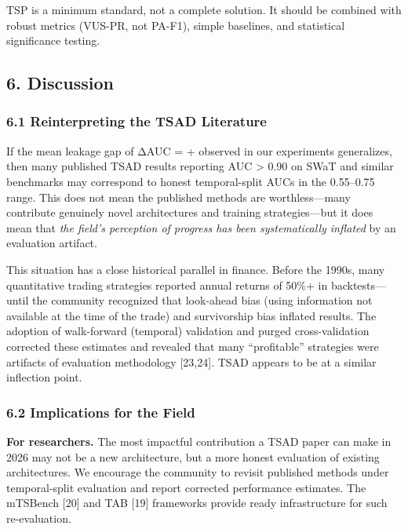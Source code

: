 \documentclass[
]{article}
\begin{document}
TSP is a minimum standard, not a complete solution. It should be
combined with robust metrics (VUS-PR, not PA-F1), simple baselines, and
statistical significance testing.

\subsection{6. Discussion}\label{discussion}

\subsubsection{6.1 Reinterpreting the TSAD
Literature}\label{reinterpreting-the-tsad-literature}

If the mean leakage gap of ΔAUC = + observed in our experiments
generalizes, then many published TSAD results reporting AUC
\textgreater{} 0.90 on SWaT and similar benchmarks may correspond to
honest temporal-split AUCs in the 0.55--0.75 range. This does not mean
the published methods are worthless---many contribute genuinely novel
architectures and training strategies---but it does mean that \emph{the
field's perception of progress has been systematically inflated} by an
evaluation artifact.

This situation has a close historical parallel in finance. Before the
1990s, many quantitative trading strategies reported annual returns of
50\%+ in backtests---until the community recognized that look-ahead bias
(using information not available at the time of the trade) and
survivorship bias inflated results. The adoption of walk-forward
(temporal) validation and purged cross-validation corrected these
estimates and revealed that many ``profitable'' strategies were
artifacts of evaluation methodology {[}23,24{]}. TSAD appears to be at a
similar inflection point.

\subsubsection{6.2 Implications for the
Field}\label{implications-for-the-field}

\textbf{For researchers.} The most impactful contribution a TSAD paper
can make in 2026 may not be a new architecture, but a more honest
evaluation of existing architectures. We encourage the community to
revisit published methods under temporal-split evaluation and report
corrected performance estimates. The mTSBench {[}20{]} and TAB {[}19{]}
frameworks provide ready infrastructure for such re-evaluation.
\end{document}
